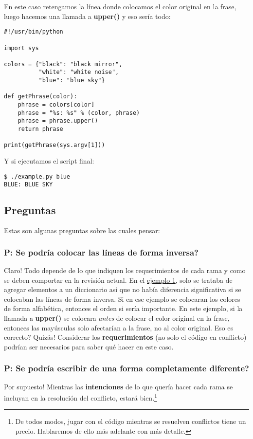 En este caso retengamos la línea donde colocamos el color original en la frase, luego hacemos una llamada a {\bf upper()}
y eso sería todo:
\begin{lstlisting}[style=python_style, caption={\bf Ejemplo 2} - Conflicto resuelto]
#!/usr/bin/python

import sys

colors = {"black": "black mirror",
          "white": "white noise",
          "blue": "blue sky"}

def getPhrase(color):
    phrase = colors[color]
    phrase = "%s: %s" % (color, phrase)
    phrase = phrase.upper()
    return phrase

print(getPhrase(sys.argv[1]))
\end{lstlisting}

Y si ejecutamos el script final:
\begin{lstlisting}[style=console_style, caption={\bf Ejemplo 2} - ejecutando el script final]
$ ./example.py blue
BLUE: BLUE SKY
\end{lstlisting}

\subsection{Preguntas}
Estas son algunas preguntas sobre las cuales pensar:

\subsubsection{P: Se podría colocar las líneas de forma inversa?}
Claro! Todo depende de lo que indiquen los requerimientos de cada rama y como se deben comportar en la revisión actual.
En el \hyperref[example_01]{ejemplo 1}, solo se trataba de agregar elementos a un diccionario así que no había diferencia
significativa si se colocaban las líneas de forma inversa. Si en ese ejemplo se colocaran los colores de forma alfabética,
entonces el orden si sería importante. En este ejemplo, si la llamada a {\bf upper()} se colocara {\it antes} de colocar
el color original en la frase, entonces las mayúsculas solo afectarían a la frase, no al color original. Eso es correcto?
Quizás! Considerar los {\bf requerimientos} (no solo el código en conflicto) podrían ser necesarios para saber qué hacer
en este caso.

\subsubsection{P: Se podría escribir de una forma completamente diferente?}
Por supuesto! Mientras las {\bf intenciones} de lo que quería hacer cada rama se incluyan en la resolución del conflicto,
estará bien.\footnote{De todos modos, jugar con el código mientras se resuelven conflictos tiene un precio. Hablaremos de ello
más adelante con más detalle.}

